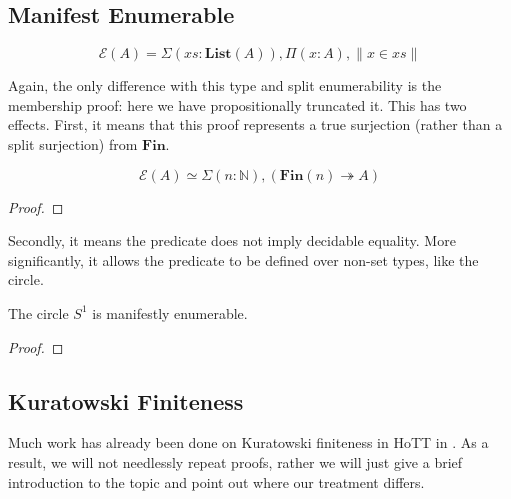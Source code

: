 \subsection{Manifest Enumerable}
\begin{romdefinition}
  \begin{equation}
    \mathcal{E}(A) = \Sigma {(\mathit{xs} : \mathbf{List}(A))} , \Pi {(x : A)} , \lVert x \in \mathit{xs} \rVert
  \end{equation}
\end{romdefinition}
Again, the only difference with this type and split enumerability is the
membership proof: here we have propositionally truncated it.
This has two effects.
First, it means that this proof represents a true surjection (rather than a
split surjection) from \(\mathbf{Fin}\).
\begin{romlemma}
  \begin{equation}
    \mathcal{E}(A) \simeq \Sigma(n : \mathbb{N}) , (\mathbf{Fin}(n) \twoheadrightarrow A)
  \end{equation}
\end{romlemma}
\begin{proof}
\end{proof}

Secondly, it means the predicate does not imply decidable equality.
More significantly, it allows the predicate to be defined over non-set types,
like the circle.
\begin{romlemma}
  The circle \(S^1\) is manifestly enumerable.
\end{romlemma}
\begin{proof}
\end{proof}

\subsection{Kuratowski Finiteness}
Much work has already been done on Kuratowski finiteness in HoTT in
\cite{fruminFiniteSetsHomotopy2018}.
As a result, we will not needlessly repeat proofs, rather we will just give a
brief introduction to the topic and point out where our treatment differs.

